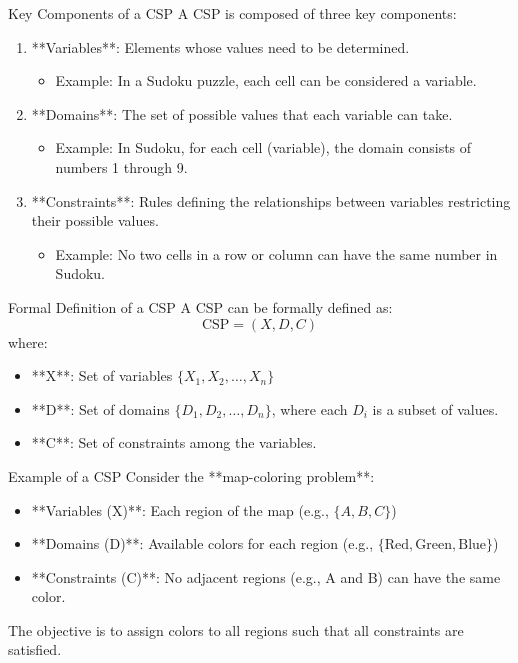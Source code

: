 \documentclass[aspectratio=169]{beamer}
\begin{document}
\begin{frame}[fragile]{Key Components of a CSP}
  A CSP is composed of three key components:
  \begin{enumerate}
    \item **Variables**: Elements whose values need to be determined. 
          \begin{itemize}
            \item Example: In a Sudoku puzzle, each cell can be considered a variable.
          \end{itemize}
    \item **Domains**: The set of possible values that each variable can take. 
          \begin{itemize}
            \item Example: In Sudoku, for each cell (variable), the domain consists of numbers 1 through 9.
          \end{itemize}
    \item **Constraints**: Rules defining the relationships between variables restricting their possible values.
          \begin{itemize}
            \item Example: No two cells in a row or column can have the same number in Sudoku.
          \end{itemize}
  \end{enumerate}
\end{frame}

\begin{frame}[fragile]{Formal Definition of a CSP}
  A CSP can be formally defined as:
  \begin{equation}
  \text{CSP} = (X, D, C)
  \end{equation}
  where:
  \begin{itemize}
    \item **X**: Set of variables $\{X_1, X_2, \ldots, X_n\}$
    \item **D**: Set of domains $\{D_1, D_2, \ldots, D_n\}$, where each $D_i$ is a subset of values.
    \item **C**: Set of constraints among the variables.
  \end{itemize}
\end{frame}

\begin{frame}[fragile]{Example of a CSP}
  Consider the **map-coloring problem**:
  \begin{itemize}
    \item **Variables (X)**: Each region of the map (e.g., $\{A, B, C\}$)
    \item **Domains (D)**: Available colors for each region (e.g., $\{ \text{Red}, \text{Green}, \text{Blue} \}$)
    \item **Constraints (C)**: No adjacent regions (e.g., A and B) can have the same color.
  \end{itemize}
  The objective is to assign colors to all regions such that all constraints are satisfied.
\end{frame}
\end{document}
